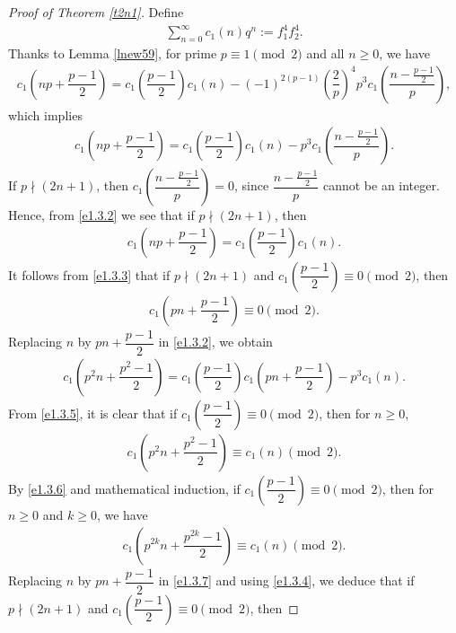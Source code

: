 \documentclass[11pt,a4paper]{article}
\numberwithin{equation}{section}
\theoremstyle{plain}
\begin{document}
\begin{proof}[Proof of Theorem \ref{t2n1}\unskip]
Define 
\begin{align}\label{e1.3.1}
\sum_{n=0}^{\infty}c_1(n)q^n:=f_1^4f_2^4.
\end{align}
Thanks to Lemma \ref{lnew59}, for prime $p\equiv1 \pmod 2$ and all $n\ge 0$, we have
\begin{align*}
c_1\left(np+\dfrac{p-1}{2}\right)=c_1\left(\dfrac{p-1}{2}\right)c_1(n)-(-1)^{2(p-1)}	\left(\dfrac{2}{p}\right)^4 p^3 c_1\left(\dfrac{n-\frac{p-1}{2}}{p}\right),
\end{align*}
which implies
\begin{align}\label{e1.3.2}
c_1\left(np+\dfrac{p-1}{2}\right)=c_1\left(\dfrac{p-1}{2}\right)c_1(n)-p^3c_1\left(\dfrac{n-\frac{p-1}{2}}{p}\right).
\end{align}
If $p\nmid(2n+1)$, then $c_1\left(\dfrac{n-\frac{p-1}{2}}{p}\right)=0$, since $\dfrac{n-\frac{p-1}{2}}{p}$ cannot be an integer. Hence, from \eqref{e1.3.2} we see that if $p\nmid(2n+1)$, then
\begin{align}\label{e1.3.3}
c_1\left(np+\dfrac{p-1}{2}\right)=c_1\left(\dfrac{p-1}{2}\right)c_1(n).
\end{align}
It follows from \eqref{e1.3.3} that if $p\nmid(2n+1)$ and $c_1\left(\dfrac{p-1}{2}\right)\equiv 0\pmod 2$, then 
\begin{align}\label{e1.3.4}
c_1\left(pn+\dfrac{p-1}{2}\right)\equiv 0\pmod 2.
\end{align}
Replacing $n$ by $pn+\dfrac{p-1}{2}$ in \eqref{e1.3.2}, we obtain
\begin{align}\label{e1.3.5}
c_1\left(p^2n+\dfrac{p^2-1}{2}\right)= c_1\left(\dfrac{p-1}{2}\right)c_1\left(pn+\dfrac{p-1}{2}\right)-p^3c_1(n).
\end{align}
From \eqref{e1.3.5}, it is clear that if $c_1\left(\dfrac{p-1}{2}\right)\equiv 0\pmod 2$, then for $n\ge0$, 
\begin{align}\label{e1.3.6}
c_1\left(p^2n+\dfrac{p^2-1}{2}\right)\equiv c_1(n)\pmod 2.
\end{align}
By \eqref{e1.3.6} and mathematical induction, if $c_1\left(\dfrac{p-1}{2}\right)\equiv 0\pmod 2$, then for $n\ge 0$ and $k\ge 0$, we have
\begin{align}\label{e1.3.7}
c_1\left(p^{2k}n+\dfrac{p^{2k}-1}{2}\right)\equiv c_1(n)\pmod 2.
\end{align}
Replacing $n$ by $pn+\dfrac{p-1}{2}$ in \eqref{e1.3.7} and using \eqref{e1.3.4}, we deduce that if $p\nmid(2n+1)$ and $c_1\left(\dfrac{p-1}{2}\right)\equiv 0\pmod 2$, then 

\end{proof}
\end{document}
